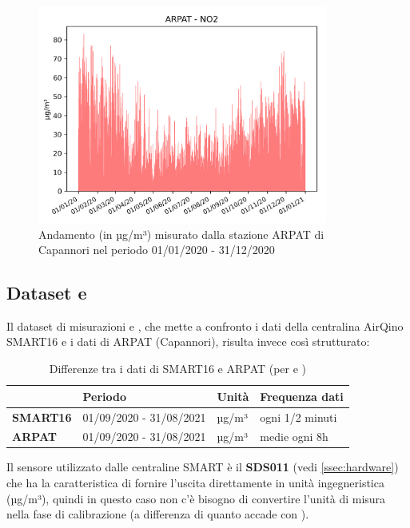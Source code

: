 \begin{figure}[H]
\centering
\captionsetup{justification=centering}
\includegraphics[width=0.85\textwidth,height=\textheight,keepaspectratio]{img/lu-capannori_no2_2020_cleaned_no2.png}
\caption{Andamento  (in µg/m³) misurato dalla stazione ARPAT di Capannori nel periodo 01/01/2020 - 31/12/2020}
\label{fig:arpat-no2}
\end{figure}
\clearpage

\subsection{Dataset  e }\label{ssec:dataset-pm}
Il dataset di misurazioni  e , che mette a confronto i dati della centralina AirQino SMART16 e i dati di ARPAT (Capannori), risulta invece così strutturato:\\

\begin{table}[H]
\centering
\def\arraystretch{0.9}
\begin{tabular}{|l|l|l|l|}
\cline{2-4}
\multicolumn{1}{c|}{} & \textbf{Periodo} & \textbf{Unità} & \textbf{Frequenza dati} \\ \hline
\textbf{SMART16} & 01/09/2020 - 31/08/2021 & µg/m³ & ogni 1/2 minuti \\ \hline
\textbf{ARPAT} & 01/09/2020 - 31/08/2021 & µg/m³ & medie ogni 8h \\ \hline
\end{tabular}
\caption{Differenze tra i dati di SMART16 e ARPAT (per  e )}
\label{tab:dataset-no2-tabella}
\end{table}

Il sensore utilizzato dalle centraline SMART è il \textbf{SDS011} (vedi \ref{ssec:hardware}) che ha la caratteristica di fornire l'uscita direttamente in unità ingegneristica (µg/m³), quindi in questo caso non c'è bisogno di convertire l'unità di misura nella fase di calibrazione (a differenza di quanto accade con ).

